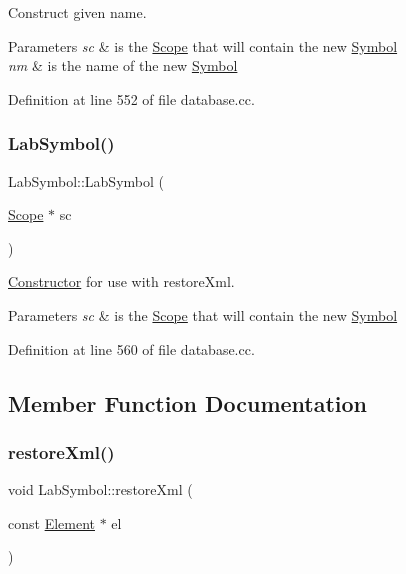 Construct given name. 


\begin{DoxyParams}{Parameters}
{\em sc} & is the \mbox{\hyperlink{class_scope}{Scope}} that will contain the new \mbox{\hyperlink{class_symbol}{Symbol}} \\
\hline
{\em nm} & is the name of the new \mbox{\hyperlink{class_symbol}{Symbol}} \\
\hline
\end{DoxyParams}


Definition at line 552 of file database.\+cc.

\mbox{\label{class_lab_symbol_a4e7a6b23242e0a18660c00480d55d1f9}} 
\subsubsection{\texorpdfstring{LabSymbol()}{LabSymbol()}\hspace{0.1cm}{\footnotesize\ttfamily [2/2]}}
{\footnotesize\ttfamily Lab\+Symbol\+::\+Lab\+Symbol (\begin{DoxyParamCaption}\item[{\mbox{\hyperlink{class_scope}{Scope}} $\ast$}]{sc }\end{DoxyParamCaption})}



\mbox{\hyperlink{class_constructor}{Constructor}} for use with restore\+Xml. 


\begin{DoxyParams}{Parameters}
{\em sc} & is the \mbox{\hyperlink{class_scope}{Scope}} that will contain the new \mbox{\hyperlink{class_symbol}{Symbol}} \\
\hline
\end{DoxyParams}


Definition at line 560 of file database.\+cc.



\subsection{Member Function Documentation}
\mbox{\label{class_lab_symbol_a856b8496e06601889db4abc4ac76fa71}} 
\subsubsection{\texorpdfstring{restoreXml()}{restoreXml()}}
{\footnotesize\ttfamily void Lab\+Symbol\+::restore\+Xml (\begin{DoxyParamCaption}\item[{const \mbox{\hyperlink{class_element}{Element}} $\ast$}]{el }\end{DoxyParamCaption})\hspace{0.3cm}{\ttfamily [virtual]}}



